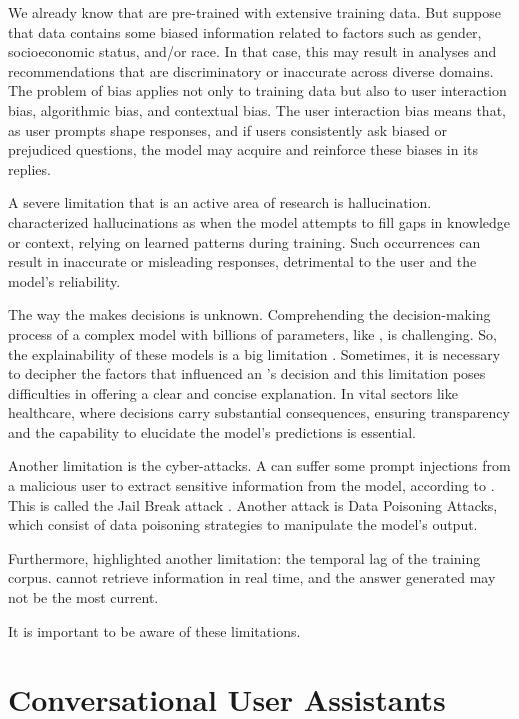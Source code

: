 We already know that {\llm} are pre-trained with extensive training data. But suppose that data contains some biased information related to factors such as gender, socioeconomic status, and/or race. In that case, this may result in analyses and recommendations that are discriminatory or inaccurate across diverse domains. The problem of bias applies not only to training data but also to user interaction bias, algorithmic bias, and contextual bias. The user interaction bias means that, as user prompts shape responses, and if users consistently ask biased or prejudiced questions, the model may acquire and reinforce these biases in its replies.

A severe limitation that is an active area of research is hallucination. \citet{church_emerging_2023} characterized {\llm} hallucinations as when the model attempts to fill gaps in knowledge or context, relying on learned patterns during training. Such occurrences can result in inaccurate or misleading responses, detrimental to the user and the model's reliability.

The way the {\llm} makes decisions is unknown. Comprehending the decision-making process of a complex model with billions of parameters, like {\llm}, is challenging. So, the explainability of these models is a big limitation \cite{hadi_LLM_2023}. Sometimes, it is necessary to decipher the factors that influenced an {\llm}'s decision and this limitation poses difficulties in offering a clear and concise explanation. In vital sectors like healthcare, where decisions carry substantial consequences, ensuring transparency and the capability to elucidate the model's predictions is essential.

Another limitation is the cyber-attacks. A {\llm} can suffer some prompt injections from a malicious user to extract sensitive information from the model, according to \citet{kshetri_cybercrime_2023}. This is called the Jail Break attack \cite{hadi_LLM_2023}. Another attack is Data Poisoning Attacks, which consist of data poisoning strategies to manipulate the model's output.

Furthermore, \citet{liu_prompting_nodate} highlighted another limitation: the temporal lag of the training corpus. {\llm} cannot retrieve information in real time, and the answer generated may not be the most current.

It is important to be aware of these limitations.


\section{Conversational User Assistants}


